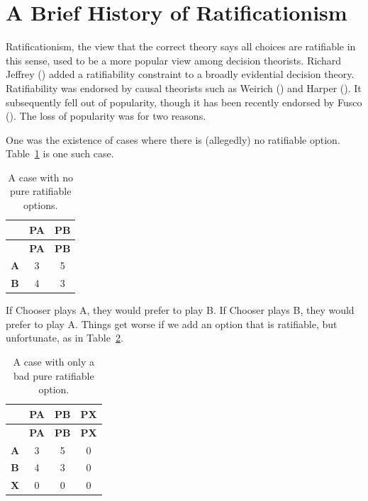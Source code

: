 \documentclass[
  12pt,
  letterpaper,
  DIV=11,
  numbers=noendperiod]{scrreprt}
\begin{document}
\section{A Brief History of
Ratificationism}\label{sec-ratify-brief-history}

Ratificationism, the view that the correct theory says all choices are
ratifiable in this sense, used to be a more popular view among decision
theorists. Richard Jeffrey () added a
ratifiability constraint to a broadly evidential decision theory.
Ratifiability was endorsed by causal theorists such as Weirich
() and Harper
(). It subsequently fell out of
popularity, though it has been recently endorsed by Fusco
(). The loss of popularity was for two
reasons.

One was the existence of cases where there is (allegedly) no ratifiable
option. Table~\ref{tbl-no-pure} is one such case.

\begin{longtable}[]{@{}ccc@{}}
\caption{A case with no pure ratifiable
options.}\label{tbl-no-pure}\tabularnewline
\toprule\noalign{}
& \textbf{PA} & \textbf{PB} \\
\midrule\noalign{}
\endfirsthead
\toprule\noalign{}
& \textbf{PA} & \textbf{PB} \\
\midrule\noalign{}
\endhead
\bottomrule\noalign{}
\endlastfoot
\textbf{A} & 3 & 5 \\
\textbf{B} & 4 & 3 \\
\end{longtable}

If Chooser plays A, they would prefer to play B. If Chooser plays B,
they would prefer to play A. Things get worse if we add an option that
is ratifiable, but unfortunate, as in Table~\ref{tbl-bad-third}.

\begin{longtable}[]{@{}cccc@{}}
\caption{A case with only a bad pure ratifiable
option.}\label{tbl-bad-third}\tabularnewline
\toprule\noalign{}
& \textbf{PA} & \textbf{PB} & \textbf{PX} \\
\midrule\noalign{}
\endfirsthead
\toprule\noalign{}
& \textbf{PA} & \textbf{PB} & \textbf{PX} \\
\midrule\noalign{}
\endhead
\bottomrule\noalign{}
\endlastfoot
\textbf{A} & 3 & 5 & 0 \\
\textbf{B} & 4 & 3 & 0 \\
\textbf{X} & 0 & 0 & 0 \\
\end{longtable}
\end{document}

